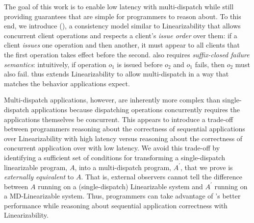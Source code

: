The goal of this work is to enable low latency with multi-dispatch while still providing guarantees that are simple for programmers to reason about.
To this end, we introduce \mdllong{} (\mdl{}), a consistency model similar to Linearizability that allows concurrent client operations and respects a client's \textit{issue order} over them:
if a client \textit{issues} one operation and then another, it must appear to all clients that the first operation takes effect before the second.
\mdl{} also requires \textit{suffix-closed failure semantics}:
intuitively, if operation $o_1$ is issued before $o_2$ and $o_1$ fails, then $o_2$ must also fail.
\Mdl{} thus extends Linearizability to allow multi-dispatch in a way that matches the behavior applications expect.

Multi-dispatch applications, however, are inherently more complex than single-dispatch applications because dispatching operations concurrently requires the applications themselves be concurrent.
This appears to introduce a trade-off between programmers reasoning about the correctness of sequential applications over Linearizability with high latency versus reasoning about the correctness of concurrent application over \mdl{} with low latency.
We avoid this trade-off by identifying a sufficient set of conditions for transforming a single-dispatch linearizable program, $A$, into a multi-dispatch program, $A^\prime$, that we prove is \textit{externally equivalent} to $A$. That is, external observers cannot tell the difference between $A$ running on a (single-dispatch) Linearizable system and $A^\prime$ running on a MD-Linearizable system. Thus, programmers can take advantage of \mdl{}'s better performance while reasoning about sequential application correctness with Linearizability.



